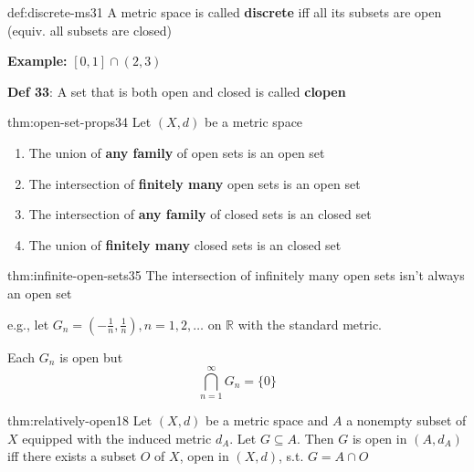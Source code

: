 \documentclass[landscape, 8pt]{extarticle}
\begin{document}
\begin{multicols}{3}
\begin{dfn}{def:discrete-ms}{31}
    \vspace{-5pt}
    A metric space is called \textbf{discrete} iff all its subsets are open (equiv. all subsets are closed)

    \textbf{Example:} $[0,1]\cap (2,3)$

    \longrule{0.08ex}
    \textbf{Def 33}: A set that is both open and closed is called \textbf{clopen}
\end{dfn}

\vspace{-5pt}
\begin{thm}{thm:open-set-props}{34}
    \vspace{-5pt}
    Let $(X,d)$ be a metric space
    \vspace{-5pt}
    \begin{enumerate}
        \item The union of \textbf{any family} of open sets is an open set
        \item The intersection of \textbf{finitely many} open sets is an open set
        \item The intersection of \textbf{any family} of closed sets is an closed set
        \item The union of \textbf{finitely many} closed sets is an closed set
    \end{enumerate}
\end{thm}

\vspace{-5pt}
\begin{rem}{thm:infinite-open-sets}{35}
    \vspace{-5pt}
    The intersection of infinitely many open sets isn't always an open set
    
    e.g., let $G_{n} = (- \frac{1}{n}, \frac{1}{n}), n = 1,2,\dots$ on $\mathbb{R}$ with the standard metric.

    Each $G_{n}$ is open but
    \[\bigcap\limits_{n = 1}^{\infty} G_{n} = \{0\}\]
\end{rem}

\vspace{-5pt}
\begin{thm}{thm:relatively-open}{18}
    \vspace{-5pt}
    Let $(X,d)$ be a metric space and $A$ a nonempty subset of $X$ equipped with the induced metric $d_{A}$. Let $G\subseteq A$. Then $G$ is open in $(A, d_{A})$ iff there exists a subset $O$ of $X$, open in $(X,d)$, s.t. $G = A \cap O$


\end{thm}
\end{multicols}
\end{document}
